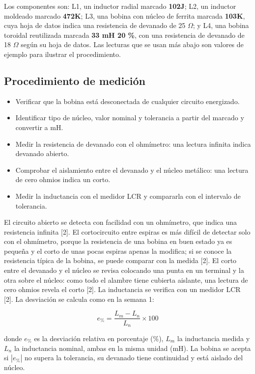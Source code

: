 \documentclass[11pt,letterpaper]{article}
\begin{document}
Los componentes son: L1, un inductor radial marcado \textbf{102J}; L2, un inductor moldeado marcado \textbf{472K}; L3, una bobina con núcleo de ferrita marcada \textbf{103K}, cuya hoja de datos indica una resistencia de devanado de 25 \ensuremath{\Omega}; y L4, una bobina toroidal reutilizada marcada \textbf{33 mH \textpm{}20 \%}, con una resistencia de devanado de 18 \ensuremath{\Omega} según su hoja de datos. Las lecturas que se usan más abajo son valores de ejemplo para ilustrar el procedimiento.

\subsection{Procedimiento de medición}

\begin{itemize}
  \item Verificar que la bobina está desconectada de cualquier circuito energizado.
  \item Identificar tipo de núcleo, valor nominal y tolerancia a partir del marcado y convertir a mH.
  \item Medir la resistencia de devanado con el ohmímetro: una lectura infinita indica devanado abierto.
  \item Comprobar el aislamiento entre el devanado y el núcleo metálico: una lectura de cero ohmios indica un corto.
  \item Medir la inductancia con el medidor LCR y compararla con el intervalo de tolerancia.
\end{itemize}

El circuito abierto se detecta con facilidad con un ohmímetro, que indica una resistencia infinita [2]. El cortocircuito entre espiras es más difícil de detectar solo con el ohmímetro, porque la resistencia de una bobina en buen estado ya es pequeña y el corto de unas pocas espiras apenas la modifica; si se conoce la resistencia típica de la bobina, se puede comparar con la medida [2]. El corto entre el devanado y el núcleo se revisa colocando una punta en un terminal y la otra sobre el núcleo: como todo el alambre tiene cubierta aislante, una lectura de cero ohmios revela el corto [2]. La inductancia se verifica con un medidor LCR [2]. La desviación se calcula como en la semana 1:

\begin{equation}
  e_{\text{\%}} = \frac{L_{m} - L_{n}}{L_{n}} \times 100
\end{equation}

donde $e_{\text{\%}}$ es la desviación relativa en porcentaje (\%), $L_m$ la inductancia medida y $L_n$ la inductancia nominal, ambas en la misma unidad (mH). La bobina se acepta si $|e_{\text{\%}}|$ no supera la tolerancia, su devanado tiene continuidad y está aislado del núcleo.
\end{document}
